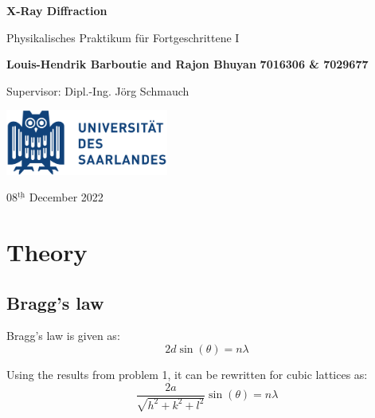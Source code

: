 \documentclass[12pt]{article}
\begin{document}
\pagestyle{fancy}
\setlength{\headheight}{15pt}

\begin{titlepage}
    \begin{center}
        \vspace*{1cm}
        \Huge
        \textbf{X-Ray Diffraction}
        
        \vspace{0.5cm}
        \LARGE
        Physikalisches Praktikum für Fortgeschrittene I
        
        \vspace{1.5cm}
        \textbf{Louis-Hendrik Barboutie and Rajon Bhuyan} \newline
        \textbf{7016306 \& 7029677}
        
        \vspace{0.5cm}
        \Large 
        Supervisor: Dipl.-Ing. Jörg Schmauch
        
        \vfill

        \includegraphics[width=0.4\textwidth]{logo_uni.png}
        
        \Large
        08$^{\underline{\text{th}}}$ December 2022
    \end{center}
\end{titlepage}

\tableofcontents
\newpage

\section{Theory}

\subsection{Bragg's law}

Bragg's law is given as:
\begin{equation}
    2d \sin(\theta) = n \lambda
    \label{eq:Bragg1}
\end{equation}

Using the results from problem 1, it can be rewritten for cubic lattices as:
\begin{equation}
    \frac{2a}{\sqrt{h^2 + k^2 + l^2}} \sin( \theta ) = n \lambda
    \label{eq:Bragg2}
\end{equation}
\end{document}
